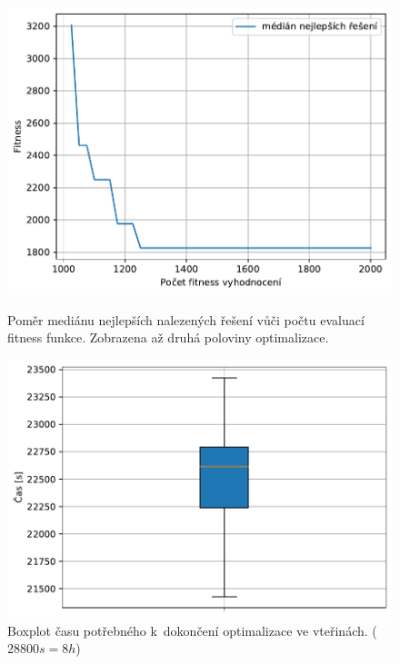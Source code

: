 \begin{figure}[H]
\begin{minipage}[t]{0.475\linewidth}
	\includegraphics[width=\textwidth]{obrazky-figures/statistics/HIFU/blob/20/DE/bestsToFitness_1.pdf}
	\caption{Poměr mediánu nejlepších nalezených řešení vůči počtu evaluací fitness funkce. Zobrazena až druhá poloviny optimalizace.}
	\label{fg:hifu:blob:de:fitPerf}
\end{minipage}
\hfill
\begin{minipage}[t]{0.475\linewidth}
\includegraphics[width=\linewidth]{obrazky-figures/statistics/HIFU/blob/20/DE/timeBoxplot_WithOutliers.pdf}
\caption{Boxplot času potřebného k~dokončení optimalizace ve vteřinách. ($28800s = 8h$)}
\label{fg:hifu:blob:de:time}
\end{minipage}
\end{figure}

